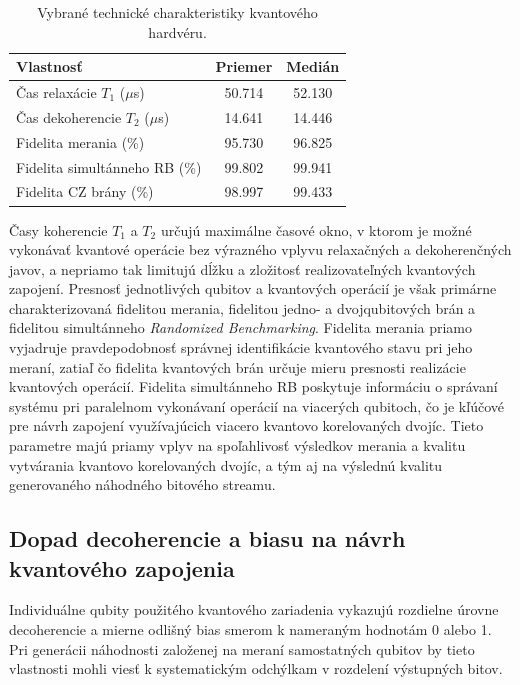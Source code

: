 \begin{table}[H]
  \centering
  \caption{Vybrané technické charakteristiky kvantového hardvéru.}
  \label{tab:qcSpecs}
  \begin{tabular}{lcc}
    \hline
    \textbf{Vlastnosť} & \textbf{Priemer} & \textbf{Medián} \\
    \hline
    Čas relaxácie $T_1$ ($\mu$s) & 50.714 & 52.130 \\
    Čas dekoherencie $T_2$ ($\mu$s) & 14.641 & 14.446 \\
    Fidelita merania (\%) & 95.730 & 96.825 \\
    Fidelita simultánneho RB (\%) & 99.802 & 99.941 \\
    Fidelita CZ brány (\%) & 98.997 & 99.433 \\
    \hline
  \end{tabular}
\end{table}

Časy koherencie $T_1$ a $T_2$ určujú maximálne časové okno, v ktorom je možné vykonávať kvantové operácie bez výrazného vplyvu relaxačných a dekoherenčných javov, a nepriamo tak limitujú dĺžku a zložitosť realizovateľných kvantových zapojení.
Presnosť jednotlivých qubitov a kvantových operácií je však primárne charakterizovaná fidelitou merania, fidelitou jedno- a dvojqubitových brán a fidelitou simultánneho \textit{Randomized Benchmarking}.
Fidelita merania priamo vyjadruje pravdepodobnosť správnej identifikácie kvantového stavu pri jeho meraní, zatiaľ čo fidelita kvantových brán určuje mieru presnosti realizácie kvantových operácií.
Fidelita simultánneho RB poskytuje informáciu o správaní systému pri paralelnom vykonávaní operácií na viacerých qubitoch, čo je kľúčové pre návrh zapojení využívajúcich viacero kvantovo korelovaných dvojíc.
Tieto parametre majú priamy vplyv na spoľahlivosť výsledkov merania a kvalitu vytvárania kvantovo korelovaných dvojíc, a tým aj na výslednú kvalitu generovaného náhodného bitového streamu.

\subsection{Dopad decoherencie a biasu na návrh kvantového zapojenia}

Individuálne qubity použitého kvantového zariadenia vykazujú rozdielne úrovne decoherencie a mierne odlišný bias smerom k nameraným hodnotám 0 alebo 1.
Pri generácii náhodnosti založenej na meraní samostatných qubitov by tieto vlastnosti mohli viesť k systematickým odchýlkam v rozdelení výstupných bitov.

